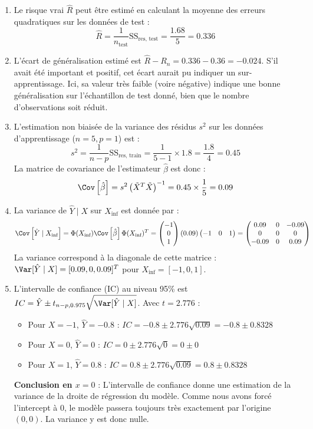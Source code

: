 \documentclass[]{../exercices}
\begin{document}
\begin{solution}
\begin{enumerate}
		\item Le risque vrai $\hat{R}$ peut être estimé en calculant la moyenne des erreurs quadratiques sur les données de test :
		\[
		\hat{R} = \frac{1}{n_{\text{test}}} \text{SS}_{\text{res, test}} = \frac{1.68}{5} = 0.336
		\]

		\item L'écart de généralisation estimé est $\hat{R} - R_n = 0.336 - 0.36 = -0.024$. S'il avait été important et positif, cet écart aurait pu indiquer un sur-apprentissage. Ici, sa valeur très faible (voire négative) indique une bonne généralisation sur l'échantillon de test donné, bien que le nombre d'observations soit réduit.

		\item L'estimation non biaisée de la variance des résidus $s^2$ sur les données d'apprentissage ($n=5, p=1$) est :
		\[
		s^2 = \frac{1}{n - p} \text{SS}_{\text{res, train}} = \frac{1}{5 - 1} \times 1.8 = \frac{1.8}{4} = 0.45
		\]
		La matrice de covariance de l'estimateur $\hat{\beta}$ est donc :
		\[
		\Cov \left[\hat{\beta}\right] = s^2 \left(\tilde{X}^T \tilde{X}\right)^{-1} = 0.45 \times \frac{1}{5} = 0.09
		\]

		\item La variance de $\hat{Y} \mid X$ sur $X_{\text{inf}}$ est donnée par :
		\[
		\Cov \left[\hat{Y} \mid X_{\text{inf}} \right] = \Phi(X_{\text{inf}}) \Cov \left[\hat{\beta}\right] \Phi(X_{\text{inf}})^T = \begin{pmatrix} -1 \\ 0 \\ 1 \end{pmatrix} (0.09) \begin{pmatrix} -1 & 0 & 1 \end{pmatrix} = \begin{pmatrix} 0.09 & 0 & -0.09 \\ 0 & 0 & 0 \\ -0.09 & 0 & 0.09 \end{pmatrix}
		\]
		La variance correspond à la diagonale de cette matrice : $\Var[\hat{Y} \mid X] = [0.09, 0, 0.09]^T$ pour $X_{\text{inf}} = [-1, 0, 1]$.

		\item L'intervalle de confiance (IC) au niveau 95\% est $IC = \hat{Y} \pm t_{n-p, 0.975} \sqrt{\Var[\hat{Y} \mid X]}$.
		Avec $t = 2.776$ :
		\begin{itemize}
			\item Pour $X = -1$, $\hat{Y} = -0.8$ : $IC = -0.8 \pm 2.776 \sqrt{0.09} = -0.8 \pm 0.8328$
			\item Pour $X = 0$, $\hat{Y} = 0$ : $IC = 0 \pm 2.776 \sqrt{0} = 0 \pm 0$
			\item Pour $X = 1$, $\hat{Y} = 0.8$ : $IC = 0.8 \pm 2.776 \sqrt{0.09} = 0.8 \pm 0.8328$
		\end{itemize}
		\textbf{Conclusion en $x=0$} : L'intervalle de confiance donne une estimation de la variance de la droite de régression du modèle. Comme nous avons forcé l'intercept à 0, le modèle passera toujours très exactement par l'origine $(0, 0)$. La variance y est donc nulle.


\end{enumerate}
\end{solution}
\end{document}
